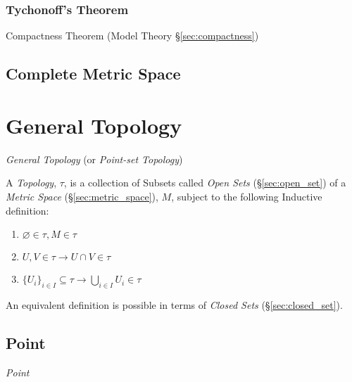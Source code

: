 \subsubsection{Tychonoff's Theorem}\label{sec:tychonoffs_theorem}

Compactness Theorem (Model Theory \S\ref{sec:compactness})



\subsection{Complete Metric Space}\label{sec:complete_metric_space}




\section{General Topology}\label{sec:general_topology}

\emph{General Topology} (or \emph{Point-set Topology})

A \emph{Topology}, $\tau$, is a collection of Subsets called
\emph{Open Sets} (\S\ref{sec:open_set}) of a \emph{Metric Space}
(\S\ref{sec:metric_space}), $M$, subject to the following Inductive
definition:
\begin{enumerate}
\item $\varnothing \in \tau, M \in \tau$
\item $U,V \in \tau \rightarrow U \cap V \in \tau$
\item $\{U_i\}_{i \in I} \subseteq \tau \rightarrow \bigcup_{i \in I}
  U_i \in \tau$
\end{enumerate}

An equivalent definition is possible in terms of \emph{Closed Sets}
(\S\ref{sec:closed_set}).



\subsection{Point}\label{sec:topological_point}

\emph{Point}

